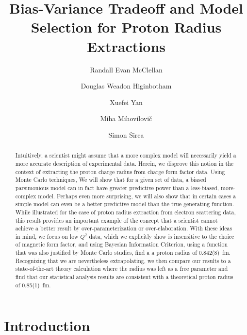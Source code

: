 \documentclass[10pt,aps,prc,twocolumn]{revtex4-1}
\begin{document}
\title{Bias-Variance Tradeoff and Model Selection for Proton Radius Extractions}

\author{Randall Evan McClellan}
\author{Douglas Weadon Higinbotham}

\author{Xuefei Yan}

\author{Miha Mihovilovi\v{c}}
\author{Simon \v{S}irca}

\begin{abstract}
Intuitively, a scientist might assume that a more complex model will necessarily yield a more 
accurate description of experimental data.   Herein, we disprove this notion in the context of extracting 
the proton charge radius from charge form factor data.   Using Monte Carlo techniques, We will show that 
for a given set of data, a biased parsimonious model can in fact have greater predictive power than a 
less-biased, more-complex model.  Perhaps even more surprising, we will also show that in certain cases a simple model 
can even be a better predictive model than the true generating function.   While illustrated for the case of proton
radius extraction from electron scattering data, this result provides an important example of the concept that 
a scientist cannot achieve a better result by over-parameterization or over-elaboration. 
With these ideas in mind, we focus on low $Q^2$ data, which we explicitly show is insensitive to the choice of 
magnetic form factor, and using Bayesian Information Criterion, using a function that was also justified by Monte Carlo 
studies, find a a proton radius of 0.842(8)~fm.    Recognizing that we are nevertheless extrapolating, 
we then compare our results to a state-of-the-art theory calculation where the radius was left as a free parameter
and find that our statistical analysis results are consistent with a theoretical proton radius of 0.85(1)~fm.   
\end{abstract}

\maketitle

\section{Introduction}
\end{document}
